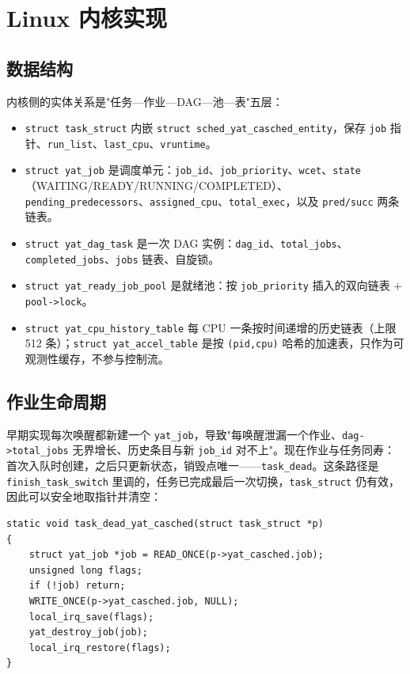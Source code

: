 
\section{Linux 内核实现} \label{sec:kernel}

\subsection{数据结构}

内核侧的实体关系是"任务—作业—DAG—池—表"五层：

\begin{itemize}
  \item \texttt{struct task\_struct} 内嵌 \texttt{struct sched\_yat\_casched\_entity}，保存 \texttt{job} 指针、\texttt{run\_list}、\texttt{last\_cpu}、\texttt{vruntime}。
  \item \texttt{struct yat\_job} 是调度单元：\texttt{job\_id}、\texttt{job\_priority}、\texttt{wcet}、\texttt{state}（WAITING/READY/RUNNING/COMPLETED）、\texttt{pending\_predecessors}、\texttt{assigned\_cpu}、\texttt{total\_exec}，以及 \texttt{pred/succ} 两条链表。
  \item \texttt{struct yat\_dag\_task} 是一次 DAG 实例：\texttt{dag\_id}、\texttt{total\_jobs}、\texttt{completed\_jobs}、\texttt{jobs} 链表、自旋锁。
  \item \texttt{struct yat\_ready\_job\_pool} 是就绪池：按 \texttt{job\_priority} 插入的双向链表 + \texttt{pool->lock}。
  \item \texttt{struct yat\_cpu\_history\_table} 每 CPU 一条按时间递增的历史链表（上限 512 条）；\texttt{struct yat\_accel\_table} 是按 \texttt{(pid,cpu)} 哈希的加速表，只作为可观测性缓存，不参与控制流。
\end{itemize}

\subsection{作业生命周期}

早期实现每次唤醒都新建一个 \texttt{yat\_job}，导致"每唤醒泄漏一个作业、\texttt{dag->total\_jobs} 无界增长、历史条目与新 \texttt{job\_id} 对不上"。现在作业与任务同寿：首次入队时创建，之后只更新状态，销毁点唯一——\texttt{task\_dead}。这条路径是 \texttt{finish\_task\_switch} 里调的，任务已完成最后一次切换，\texttt{task\_struct} 仍有效，因此可以安全地取指针并清空：

\begin{verbatim}
static void task_dead_yat_casched(struct task_struct *p)
{
    struct yat_job *job = READ_ONCE(p->yat_casched.job);
    unsigned long flags;
    if (!job) return;
    WRITE_ONCE(p->yat_casched.job, NULL);
    local_irq_save(flags);
    yat_destroy_job(job);
    local_irq_restore(flags);
}
\end{verbatim}

